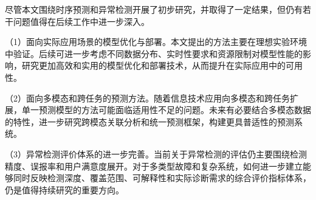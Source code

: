 尽管本文围绕时序预测和异常检测开展了初步研究，并取得了一定结果，但仍有若干问题值得在后续工作中进一步深入。

（1）面向实际应用场景的模型优化与部署。本文提出的方法主要在理想实验环境中验证。后续可进一步考虑不同数据分布、实时性要求和资源限制对模型性能的影响，研究更加高效和实用的模型优化和部署技术，从而提升在实际应用中的可用性。

（2）面向多模态和跨任务的预测方法。随着信息技术应用向多模态和跨任务扩展，单一预测模型的方法可能面临适用性不足的问题。未来有必要结合多模态数据的特性，进一步研究跨模态关联分析和统一预测框架，构建更具普适性的预测系统。

（3）异常检测评价体系的进一步完善。当前关于异常检测的评估仍主要围绕检测精度、误报率和用户满意度展开。对于多类型故障和复杂系统，如何进一步建立能够同时反映检测深度、覆盖范围、可解释性和实际诊断需求的综合评价指标体系，仍是值得持续研究的重要方向。